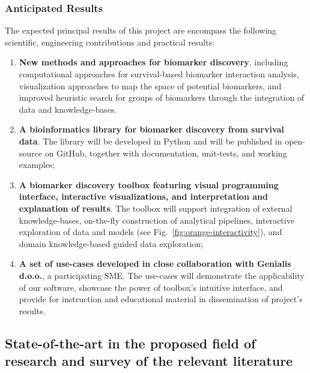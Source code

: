 \documentclass[11pt,a4paper]{article}
\renewcommand{\bold}{\textbf}
\begin{document}
\subsubsection*{Anticipated Results}
The expected principal results of this project are encompass the following scientific, engineering contributions and practical results:
\begin{enumerate}
	\item \bold{New methods and approaches for biomarker discovery}, including computational approaches for survival-based biomarker interaction analysis, visualization approaches to map the space of potential biomarkers, and improved heuristic search for groups of biomarkers through the integration of data and knowledge-bases.
	\item \bold{A bioinformatics library for biomarker discovery from survival data}. The library will be developed in Python and will be published in open-source on GitHub, together with documentation, unit-tests, and working examples;
	\item \bold{A biomarker discovery toolbox featuring visual programming interface, interactive visualizations, and interpretation and explanation of results}. The toolbox will support integration of external knowledge-bases, on-the-fly construction of analytical pipelines, interactive exploration of data and models (see Fig.~\ref{fig:orange-interactivity}), and domain knowledge-based guided data exploration;
	\item \bold{A set of use-cases developed in close collaboration with Genialis d.o.o.}, a participating SME. The use-cases will demonstrate the applicability of our software, showcase the power of toolbox's intuitive interface, and provide for instruction and educational material in dissemination of project's results.
\end{enumerate}



\subsection{State-of-the-art in the proposed field of research and survey of the relevant literature}
\end{document}
